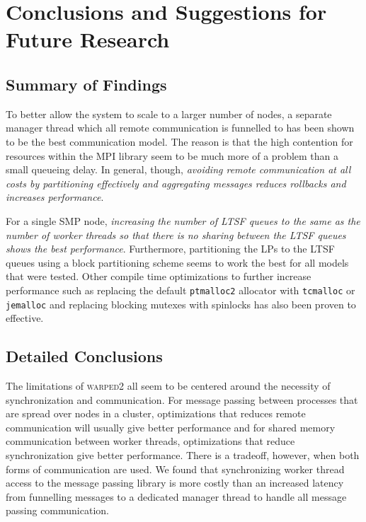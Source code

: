 \documentclass[11pt]{book}
\begin{document}
\chapter[Conclusions \& Future Research]{Conclusions and Suggestions for Future Research}
\label{conclude}

\section{Summary of Findings}

To better allow the system to scale to a larger number of nodes, a separate manager thread which all
remote communication is funnelled to has been shown to be the best communication model.  The reason
is that the high contention for resources within the MPI library seem to be much more of a problem
than a small queueing delay.  In general, though, \emph{avoiding remote communication at all costs
  by partitioning effectively and aggregating messages reduces rollbacks and increases performance}.

For a single SMP node, \emph{increasing the number of LTSF queues to the same as the number of
  worker threads so that there is no sharing between the LTSF queues shows the best performance}.
Furthermore, partitioning the LPs to the LTSF queues using a block partitioning scheme seems to work
the best for all models that were tested.  Other compile time optimizations to further increase
performance such as replacing the default \texttt{ptmalloc2} allocator with \texttt{tcmalloc} or
\texttt{jemalloc} and replacing blocking mutexes with spinlocks has also been proven to effective. 

\section{Detailed Conclusions}

The limitations of \textsc{warped2} all seem to be centered around the necessity of synchronization
and communication.  For message passing between processes that are spread over nodes in a cluster,
optimizations that reduces remote communication will usually give better performance and for shared
memory communication between worker threads, optimizations that reduce synchronization give better
performance.  There is a tradeoff, however, when both forms of communication are used.  We found
that synchronizing worker thread access to the message passing library is more costly than an
increased latency from funnelling messages to a dedicated manager thread to handle all message
passing communication.
\end{document}

